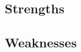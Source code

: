 \documentclass[paper.tex]{subfiles}
\begin{document}
	\subsection{Strengths}
	
	\subsection{Weaknesses}
	
\end{document}
